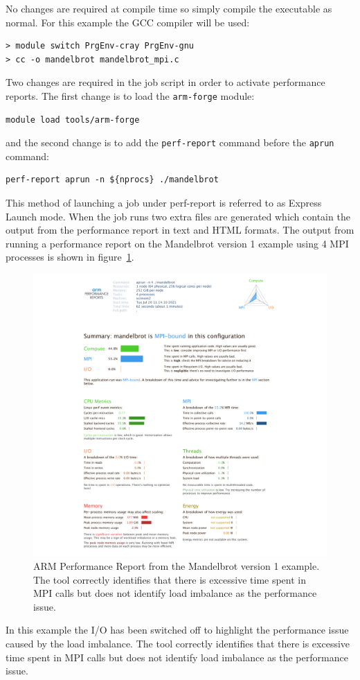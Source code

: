\documentclass[a4paper,titlepage]{article}
\begin{document}
No changes are required at compile time so simply compile the executable as normal. For this example the GCC compiler will be used:
\begin{verbatim}
> module switch PrgEnv-cray PrgEnv-gnu
> cc -o mandelbrot mandelbrot_mpi.c
\end{verbatim}
Two changes are required in the job script in order to activate performance reports. The first change is to load the \texttt{arm-forge} module:
\begin{verbatim}
module load tools/arm-forge
\end{verbatim}
and the second change is to add the \texttt{perf-report} command before the \texttt{aprun} command:
\begin{verbatim}
perf-report aprun -n ${nprocs} ./mandelbrot
\end{verbatim}
This method of launching a job under perf-report is referred to as Express Launch mode.
%
When the job runs two extra files are generated which contain the output from the performance report in text and HTML formats. The output from running a performance report on the Mandelbrot version 1 example using 4 MPI processes is shown in figure~\ref{fig:perf-report_MB1}.  
%
\begin{figure}[htbp]
\begin{center}
\includegraphics[scale=0.35]{figures/mandelbrot_v1_PerformanceReport}
\caption{ARM Performance Report from the Mandelbrot version 1 example. The tool correctly identifies that there is excessive time spent in MPI calls but does not identify load imbalance as the performance issue.}
\label{fig:perf-report_MB1}
\end{center}
\end{figure}
In this example the I/O has been switched off to highlight the performance issue caused by the load imbalance. The tool correctly identifies that there is excessive time spent in MPI calls but does not identify load imbalance as the performance issue. 
\end{document}
